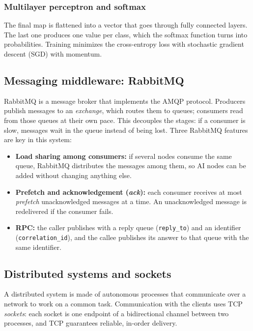 \documentclass[10pt,a4paper]{article}
\begin{document}
\subsubsection{Multilayer perceptron and softmax}

The final map is flattened into a vector that goes through fully connected layers. The last one
produces one value per class, which the softmax function turns into probabilities. Training minimizes
the cross-entropy loss with stochastic gradient descent (SGD) with momentum.

\subsection{Messaging middleware: RabbitMQ}

RabbitMQ is a message broker that implements the AMQP protocol. Producers publish messages to an
\textit{exchange}, which routes them to queues; consumers read from those queues at their own pace.
This decouples the stages: if a consumer is slow, messages wait in the queue instead of being lost.
Three RabbitMQ features are key in this system:
\begin{itemize}
    \item \textbf{Load sharing among consumers:} if several nodes consume the same queue, RabbitMQ
    distributes the messages among them, so AI nodes can be added without changing anything else.
    \item \textbf{Prefetch and acknowledgement (\textit{ack}):} each consumer receives at most
    \textit{prefetch} unacknowledged messages at a time. An unacknowledged message is redelivered if
    the consumer fails.
    \item \textbf{RPC:} the caller publishes with a reply queue (\texttt{reply\_to}) and an identifier
    (\texttt{correlation\_id}), and the callee publishes its answer to that queue with the same
    identifier.
\end{itemize}

\subsection{Distributed systems and sockets}

A distributed system is made of autonomous processes that communicate over a network to work on a
common task. Communication with the clients uses TCP \textit{sockets}: each socket is one endpoint of
a bidirectional channel between two processes, and TCP guarantees reliable, in-order delivery.
\end{document}
